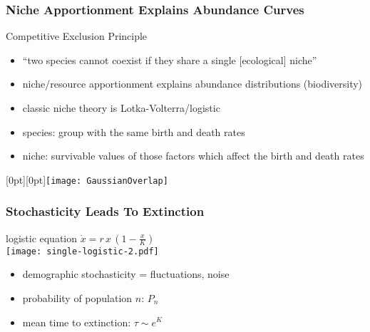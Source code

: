 \documentclass{beamer}
\begin{document}
\newcommand{\lenitem}[2][.5\linewidth]{\parbox[t]{#1}{\strut #2\strut}}
\begin{frame}
\frametitle{Niche Apportionment Explains Abundance Curves}
\vspace{-4\baselineskip}
\Large{Competitive Exclusion Principle}\normalsize{}
\begin{itemize}
	\item``two species cannot coexist if they share a single [ecological] niche''%
	\item niche/resource apportionment explains abundance distributions (biodiversity)
	\item classic niche theory is Lotka-Volterra/logistic
	\pause
	\item \lenitem{species: group with the same birth and death rates}
	\item \lenitem{niche: survivable values of those factors which affect the birth and death rates}
\end{itemize}
\vspace*{-6\baselineskip}
\mbox{}\hfill\raisebox{-\height}[0pt][0pt]{\texttt{[image: GaussianOverlap]}}
\end{frame}


\begin{frame}
\frametitle{Stochasticity Leads To Extinction}
\centering
logistic equation $\dot{x} = r \, x \, \left(1-\frac{x}{K}\right)$ \\
\texttt{[image: single-logistic-2.pdf]}
\begin{itemize}
	\item demographic stochasticity = fluctuations, noise
	\pause
	\item probability of population $n$: $P_n$
	\item mean time to extinction: $\tau \sim e^K$ %
\end{itemize}
\end{frame}
\end{document}
